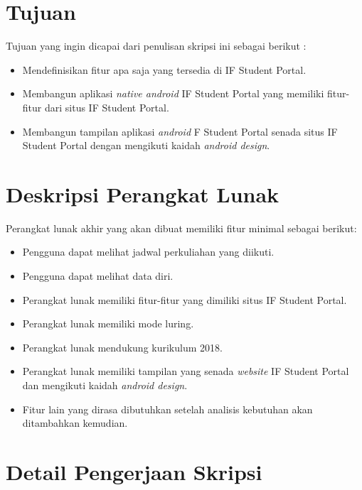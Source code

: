 \documentclass[a4paper,twoside]{article}
\begin{document}
\section{Tujuan}
Tujuan yang ingin dicapai dari penulisan skripsi ini sebagai berikut :
\begin{itemize}
    \item Mendefinisikan fitur apa saja yang tersedia di IF Student Portal.
    \item Membangun aplikasi \textit{native android} IF Student Portal yang memiliki fitur-fitur dari situs IF Student Portal.
    \item Membangun tampilan aplikasi \textit{android} F Student Portal senada situs IF Student Portal dengan mengikuti kaidah \textit{android design}.
    
\end{itemize}

\section{Deskripsi Perangkat Lunak}

Perangkat lunak akhir yang akan dibuat memiliki fitur minimal sebagai berikut:
\begin{itemize}
	\item Pengguna dapat melihat jadwal perkuliahan yang diikuti.
	\item Pengguna dapat melihat data diri.
	\item Perangkat lunak memiliki fitur-fitur yang dimiliki situs IF Student Portal.
	\item Perangkat lunak memiliki mode luring.
	\item Perangkat lunak mendukung kurikulum 2018.
	\item Perangkat lunak memiliki tampilan yang senada \textit{website} IF Student Portal dan mengikuti kaidah \textit{android design}.
	\item Fitur lain yang dirasa dibutuhkan setelah analisis kebutuhan akan ditambahkan kemudian.
\end{itemize}

\section{Detail Pengerjaan Skripsi}
\end{document}
